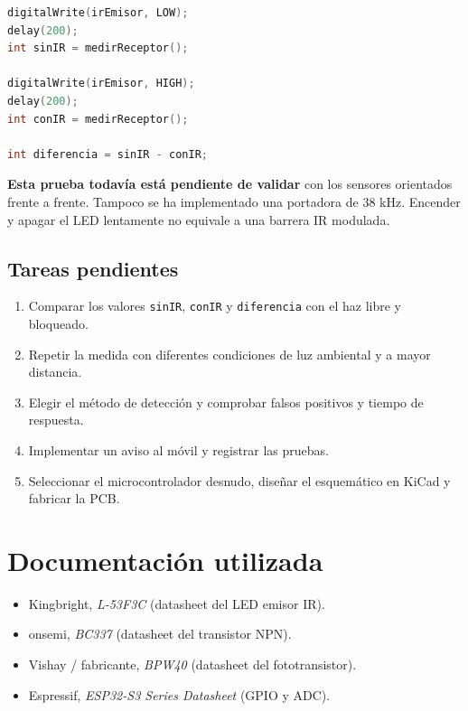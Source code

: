 \documentclass[11pt,a4paper]{article}
\begin{document}
\begin{lstlisting}[language=C++,caption={Fragmento del ensayo diferencial preparado en PlatformIO.}]
digitalWrite(irEmisor, LOW);
delay(200);
int sinIR = medirReceptor();

digitalWrite(irEmisor, HIGH);
delay(200);
int conIR = medirReceptor();

int diferencia = sinIR - conIR;
\end{lstlisting}

\textbf{Esta prueba todavía está pendiente de validar} con los sensores orientados frente a frente. Tampoco se ha implementado una portadora de 38 kHz. Encender y apagar el LED lentamente no equivale a una barrera IR modulada.

\subsection{Tareas pendientes}
\begin{enumerate}
\item Comparar los valores \texttt{sinIR}, \texttt{conIR} y \texttt{diferencia} con el haz libre y bloqueado.
\item Repetir la medida con diferentes condiciones de luz ambiental y a mayor distancia.
\item Elegir el método de detección y comprobar falsos positivos y tiempo de respuesta.
\item Implementar un aviso al móvil y registrar las pruebas.
\item Seleccionar el microcontrolador desnudo, diseñar el esquemático en KiCad y fabricar la PCB.
\end{enumerate}

\section{Documentación utilizada}
\begin{itemize}
\item Kingbright, \emph{L-53F3C} (datasheet del LED emisor IR).
\item onsemi, \emph{BC337} (datasheet del transistor NPN).
\item Vishay / fabricante, \emph{BPW40} (datasheet del fototransistor).
\item Espressif, \emph{ESP32-S3 Series Datasheet} (GPIO y ADC).
\end{itemize}
\end{document}
